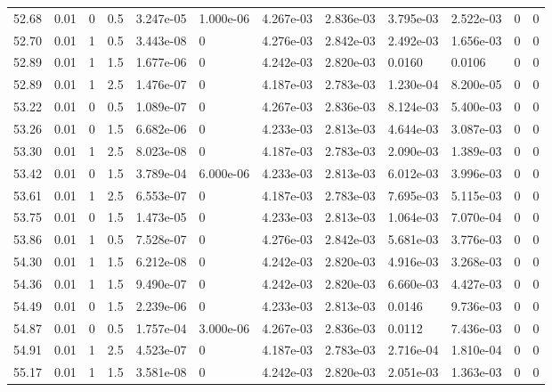 \documentclass[preview]{standalone}
\begin{document}
{{{{{{{{\begin{tabular}{L{1.2cm}C{1.2cm} C{0.3cm}C{0.5cm} C{1.4cm}C{1.4cm} C{1.4cm}C{1.4cm} C{1.6cm}C{1.6cm} C{1.6cm}C{1.6cm}}
  52.68  &  0.01  & 0     & 0.5 &  3.247e-05  & 1.000e-06  &  4.267e-03&   2.836e-03& 3.795e-03 & 2.522e-03   &  0 & 0  \\ 
  52.70  &  0.01  & 1     & 0.5 &  3.443e-08  & 0  &  4.276e-03&   2.842e-03& 2.492e-03 & 1.656e-03   &  0 & 0  \\ 
  52.89  &  0.01  & 1     & 1.5 &  1.677e-06  & 0  &  4.242e-03&   2.820e-03& 0.0160 & 0.0106   &  0 & 0  \\ 
  52.89  &  0.01  & 1     & 2.5 &  1.476e-07  & 0  &  4.187e-03&   2.783e-03& 1.230e-04 & 8.200e-05   &  0 & 0  \\ 
  53.22  &  0.01  & 0     & 0.5 &  1.089e-07  & 0  &  4.267e-03&   2.836e-03& 8.124e-03 & 5.400e-03   &  0 & 0  \\ 
  53.26  &  0.01  & 0     & 1.5 &  6.682e-06  & 0  &  4.233e-03&   2.813e-03& 4.644e-03 & 3.087e-03   &  0 & 0  \\ 
  53.30  &  0.01  & 1     & 2.5 &  8.023e-08  & 0  &  4.187e-03&   2.783e-03& 2.090e-03 & 1.389e-03   &  0 & 0  \\ 
  53.42  &  0.01  & 0     & 1.5 &  3.789e-04  & 6.000e-06  &  4.233e-03&   2.813e-03& 6.012e-03 & 3.996e-03   &  0 & 0  \\ 
  53.61  &  0.01  & 1     & 2.5 &  6.553e-07  & 0  &  4.187e-03&   2.783e-03& 7.695e-03 & 5.115e-03   &  0 & 0  \\ 
  53.75  &  0.01  & 0     & 1.5 &  1.473e-05  & 0  &  4.233e-03&   2.813e-03& 1.064e-03 & 7.070e-04   &  0 & 0  \\ 
  53.86  &  0.01  & 1     & 0.5 &  7.528e-07  & 0  &  4.276e-03&   2.842e-03& 5.681e-03 & 3.776e-03   &  0 & 0  \\ 
  54.30  &  0.01  & 1     & 1.5 &  6.212e-08  & 0  &  4.242e-03&   2.820e-03& 4.916e-03 & 3.268e-03   &  0 & 0  \\ 
  54.36  &  0.01  & 1     & 1.5 &  9.490e-07  & 0  &  4.242e-03&   2.820e-03& 6.660e-03 & 4.427e-03   &  0 & 0  \\ 
  54.49  &  0.01  & 0     & 1.5 &  2.239e-06  & 0  &  4.233e-03&   2.813e-03& 0.0146 & 9.736e-03   &  0 & 0  \\ 
  54.87  &  0.01  & 0     & 0.5 &  1.757e-04  & 3.000e-06  &  4.267e-03&   2.836e-03& 0.0112 & 7.436e-03   &  0 & 0  \\ 
  54.91  &  0.01  & 1     & 2.5 &  4.523e-07  & 0  &  4.187e-03&   2.783e-03& 2.716e-04 & 1.810e-04   &  0 & 0  \\ 
  55.17  &  0.01  & 1     & 1.5 &  3.581e-08  & 0  &  4.242e-03&   2.820e-03& 2.051e-03 & 1.363e-03   &  0 & 0  \\ 

\end{tabular}}}}}}}}}
\end{document}
